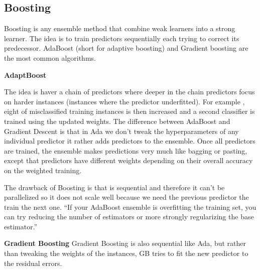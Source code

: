\documentclass[11pt]{article}
\begin{document}
\subsection{Boosting}
Boosting is any ensemble method that combine weak learners into a strong learner. The idea is to train predictors sequentially each trying to correct its predecessor. AdaBoost (short for adaptive boosting) and Gradient boosting are the most common algorithms.

\textbf{AdaptBoost}

The idea is haver a chain of predictors where deeper in the chain predictors focus on harder instances (instances where the predictor underfitted). For example , eight of misclassified training instances is then increased and a second classifier is trained using the updated weights. The difference between AdaBoost and Gradient Descent is that in Ada we don't tweak the hyperparameters of any individual predictor it rather adds predictors to the ensemble. Once all predictors are trained, the ensemble makes predictions very much like bagging or pasting, except that predictors have different weights depending on their overall accuracy on the weighted training.

The drawback of Boosting is that is sequential and therefore it can't be parallelized so it does not scale well because we need the previous predictor the train the next one.
“If your AdaBoost ensemble is overfitting the training set, you can try reducing the number of estimators or more strongly regularizing the base estimator.”

\textbf{Gradient Boosting}
Gradient Boosting is also sequential like Ada, but rather than tweaking the weights of the instances, GB tries to fit the new predictor to the residual errors.
\end{document}
